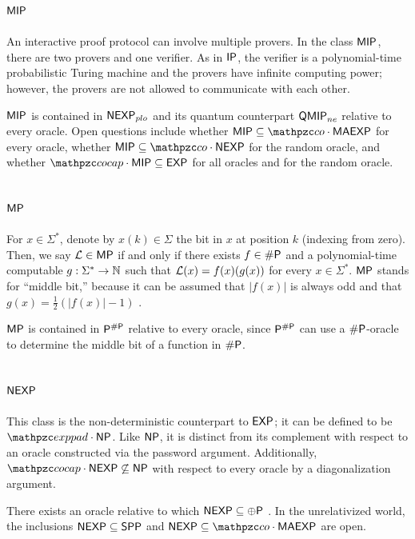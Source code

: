 \subsection{$\mathsf{MIP}$}

An interactive proof protocol can involve multiple provers. In the class 
$\mathsf{MIP}$, there are two provers and one verifier. As in $\mathsf{IP}$, the 
verifier is a polynomial-time probabilistic Turing machine and the provers have 
infinite computing power; however, the provers are not allowed to communicate 
with each other.

$\mathsf{MIP}$ is contained in $\mathsf{NEXP}_{plo}$ and its quantum counterpart 
$\mathsf{QMIP}_{ne}$ relative to every oracle. Open questions include whether  
$\msf{MIP}\subseteq\cco\cdot\msf{MAEXP}$ for every oracle, whether 
$\msf{MIP}\subseteq\cco\cdot\msf{NEXP}$ for the random oracle, and whether 
$\cocap\cdot\msf{MIP}\subseteq\msf{EXP}$ for all oracles and for the random 
oracle.

\subsection{$\mathsf{MP}$}

For $x\in\Sigma^*$, denote by $x(k)\in\Sigma$ the bit in $x$ at position $k$ 
(indexing from zero). Then, we say $\mathcal{L}\in\mathsf{MP}$ if and only if there exists 
$f\in\#\mathsf{P}$ and a polynomial-time computable $g:\Sigma^*\rightarrow\mathbb{N}$ such that 
$\mathcal{L}(x)=f(x)(g(x))$ for every $x\in\Sigma^*$. $\mathsf{MP}$ stands for ``middle 
bit,'' because it can be assumed that $|f(x)|$ is always odd and that 
$g(x)=\frac{1}{2}(|f(x)|-1)$ \cite{green1995power}.

$\mathsf{MP}$ is contained in $\mathsf{P}^{\#\mathsf{P}}$ relative to every oracle, since 
$\mathsf{P}^{\#\mathsf{P}}$ can use a $\#\mathsf{P}$-oracle to determine the middle bit of a function
in $\#\mathsf{P}$.

\subsection{$\mathsf{NEXP}$}

This class is the non-deterministic counterpart to $\mathsf{EXP}$; it can be 
defined to be $\exppad\cdot\NP$. Like $\mathsf{NP}$, it is distinct from its complement 
with respect to an oracle constructed via the password argument. Additionally, 
$\cocap\cdot\msf{NEXP}\not\subseteq\NP$ with respect to every oracle by a 
diagonalization argument.

There exists an oracle relative to which $\mathsf{NEXP}\subseteq\oplus\mathsf{P}$ 
\cite{aaronson2006oracles}. In the unrelativized world, the inclusions 
$\mathsf{NEXP}\subseteq\mathsf{SPP}$ and $\msf{NEXP}\subseteq\cco\cdot\msf{MAEXP}$ are 
open.

